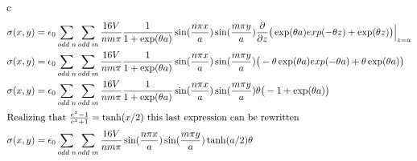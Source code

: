 \begin{homeworkProblem}[Jackson ed. 3: 2.23)]
\begin{homeworkSection}{c}
\begin{align}
\sigma(x,y) &= \epsilon_0 \sum\limits_{odd\;n} \sum\limits_{odd\;m} \frac{16 V}{n m \pi} \frac{1}{1+\exp(\theta a)} \sin(\frac{n \pi x}{a}) \sin(\frac{m \pi y}{a}) \dfrac{\partial }{\partial z}\big(\exp(\theta a)exp(-\theta z) + \exp(\theta z)\big)\Big|_{z=a} \nonumber \\
\sigma(x,y) &= \epsilon_0 \sum\limits_{odd\;n} \sum\limits_{odd\;m} \frac{16 V}{n m \pi} \frac{1}{1+\exp(\theta a)} \sin(\frac{n \pi x}{a}) \sin(\frac{m \pi y}{a}) \big(-\theta \exp(\theta a)exp(-\theta a) + \theta \exp(\theta a)\big) \nonumber \\
\sigma(x,y) &= \epsilon_0 \sum\limits_{odd\;n} \sum\limits_{odd\;m} \frac{16 V}{n m \pi} \frac{1}{1+\exp(\theta a)} \sin(\frac{n \pi x}{a}) \sin(\frac{m \pi y}{a}) \theta\big(-1 + \exp(\theta a)\big) \nonumber \\
\intertext{Realizing that $\frac{e^x-1}{e^x+1} = \tanh(x/2)$ this last expression can be rewritten} \nonumber
\sigma(x,y) &= \epsilon_0 \sum\limits_{odd\;n} \sum\limits_{odd\;m} \frac{16 V}{n m \pi} \sin(\frac{n \pi x}{a}) \sin(\frac{m \pi y}{a})\tanh(a/2) \theta \nonumber
\end{align}
\end{homeworkSection}

\end{homeworkProblem}